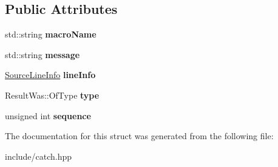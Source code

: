 \subsection*{Public Attributes}
\begin{DoxyCompactItemize}
\item 
std\+::string {\bfseries macro\+Name}\hypertarget{structCatch_1_1MessageInfo_a156ade4b3cc731f6ec7b542ae47ba8e3}{}\label{structCatch_1_1MessageInfo_a156ade4b3cc731f6ec7b542ae47ba8e3}

\item 
std\+::string {\bfseries message}\hypertarget{structCatch_1_1MessageInfo_ab6cd06e050bf426c6577502a5c50e256}{}\label{structCatch_1_1MessageInfo_ab6cd06e050bf426c6577502a5c50e256}

\item 
\hyperlink{structCatch_1_1SourceLineInfo}{Source\+Line\+Info} {\bfseries line\+Info}\hypertarget{structCatch_1_1MessageInfo_a985165328723e599696ebd8e43195cc5}{}\label{structCatch_1_1MessageInfo_a985165328723e599696ebd8e43195cc5}

\item 
Result\+Was\+::\+Of\+Type {\bfseries type}\hypertarget{structCatch_1_1MessageInfo_ae928b9117465c696e45951d9d0284e78}{}\label{structCatch_1_1MessageInfo_ae928b9117465c696e45951d9d0284e78}

\item 
unsigned int {\bfseries sequence}\hypertarget{structCatch_1_1MessageInfo_a7f4f57ea21e50160adefce7b68a781d6}{}\label{structCatch_1_1MessageInfo_a7f4f57ea21e50160adefce7b68a781d6}

\end{DoxyCompactItemize}


The documentation for this struct was generated from the following file\+:\begin{DoxyCompactItemize}
\item 
include/catch.\+hpp\end{DoxyCompactItemize}

